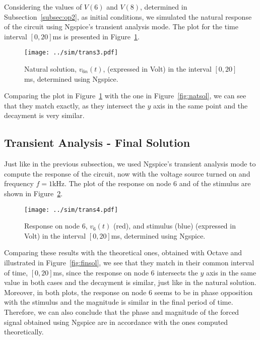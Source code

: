 Considering the values of $V(6)$ and $V(8)$, determined in Subsection~\ref{subsec:op2}, as initial conditions, we simulated the natural response of the circuit using Ngspice's transient analysis mode. The plot for the time interval $[0,20]$ms is presented in Figure~\ref{fig:trannat}.

\vspace{-10mm}

\begin{figure}[H] \centering
\texttt{[image: ../sim/trans3.pdf]}
\caption{Natural solution, $v_{6n}(t)$, (expressed in Volt) in the interval $[0,20]$ms, determined using Ngspice.}
\label{fig:trannat}
\end{figure}

Comparing the plot in Figure~\ref{fig:trannat} with the one in Figure~\ref{fig:natsol}, we can see that they match exactly, as they intersect the $y$ axis in the same point and the decayment is very similar.

\subsection{Transient Analysis - Final Solution} \label{subsec:tranfin}

Just like in the previous subsection, we used Ngspice's transient analysis mode to compute the response of the circuit, now with the voltage source turned on and frequency $f=1$kHz. The plot of the response on node 6 and of the stimulus are shown in Figure~\ref{fig:trans4}.

\vspace{-10mm}

\begin{figure}[H] \centering
\texttt{[image: ../sim/trans4.pdf]}
\caption{Response on node 6, $v_{6}(t)$ (red), and stimulus (blue) (expressed in Volt) in the interval $[0,20]$ms, determined using Ngspice.}
\label{fig:trans4}
\end{figure}

Comparing these results with the theoretical ones, obtained with Octave and illustrated in Figure~\ref{fig:finsol}, we see that they match in their common interval of time, $[0,20]$ms, since the response on node 6 intersects the $y$ axis in the same value in both cases and the decayment is similar, just like in the natural solution. Moreover, in both plots, the response on node 6 seems to be in phase opposition with the stimulus and the magnitude is similar in the final period of time. Therefore, we can also conclude that the phase and magnitude of the forced signal obtained using Ngspice are in accordance with the ones computed theoretically.

